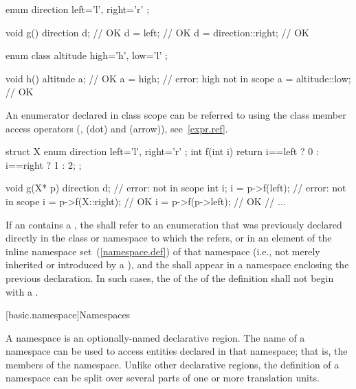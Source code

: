 \begin{codeblock}
enum direction { left='l', right='r' }; 

void g()  { 
  direction d;                  // OK 
  d = left;                     // OK 
  d = direction::right;         // OK 
} 

enum class altitude { high='h', low='l' }; 

void h()  { 
  altitude a;                   // OK 
  a = high;                     // error: high not in scope 
  a = altitude::low;            // OK 
}
\end{codeblock}
\exitexample
{}%
An enumerator declared in class scope can be referred to using the class
member access operators (\tcode{::},  (dot) and \tcode{->}
(arrow)), see~\ref{expr.ref}.
\enterexample

\begin{codeblock}
struct X {
  enum direction { left='l', right='r' };
  int f(int i) { return i==left ? 0 : i==right ? 1 : 2; }
};

void g(X* p) {
  direction d;                  // error:  not in scope
  int i;
  i = p->f(left);               // error:  not in scope
  i = p->f(X::right);           // OK
  i = p->f(p->left);            // OK
  // ...
}
\end{codeblock}
\exitexample

\pnum
If an  contains a ,
the  shall refer to an enumeration
that was previously declared directly in the class or namespace
to which the  refers, or
in an element of the inline namespace set~(\ref{namespace.def})
of that namespace (i.e., not merely inherited or introduced by a
), and
the  shall appear in
a namespace enclosing the previous declaration.
In such cases, the 
of the  of the definition
shall not begin with a .

[basic.namespace]{Namespaces}%

\pnum
A namespace is an optionally-named declarative region. The name of a
namespace can be used to access entities declared in that namespace;
that is, the members of the namespace. Unlike other declarative regions,
the definition of a namespace can be split over several parts of one or
more translation units.

